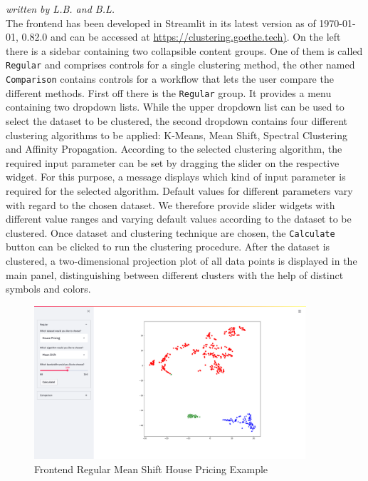 \textit{written by L.B. and B.L.}\\

The frontend has been developed in Streamlit \cite{streamlit2018} in its latest version as of \today, 0.82.0 and can be accessed at \url{https://clustering.goethe.tech)}.
On the left there is a sidebar containing two collapsible content groups. One of them is called \texttt{Regular} and comprises controls for a single clustering method, the other named \texttt{Comparison} contains controls for a workflow that lets the user compare the different methods.
First off there is the \texttt{Regular} group. It provides a menu containing two dropdown lists. While the upper dropdown list can be used to select the dataset to be clustered, the second dropdown contains four different clustering algorithms to be applied: K-Means, Mean Shift, Spectral Clustering and Affinity Propagation. According to the selected clustering algorithm, the required input parameter can be set by dragging the slider on the respective widget. For this purpose, a message displays which kind of input parameter is required for the selected algorithm. 
Default values for different parameters vary with regard to the chosen dataset. We therefore provide slider widgets with different value ranges and varying default values according to the dataset to be clustered.
Once dataset and clustering technique are chosen, the \texttt{Calculate} button can be clicked to run the clustering procedure.
After the dataset is clustered, a two-dimensional projection plot of all data points is displayed in the main panel, distinguishing between different clusters with the help of distinct symbols and colors.

\begin{figure}[H]
%
\begin{center}
\includegraphics[width=0.9\textwidth]{images/frontend_regular.png}
\caption{Frontend Regular Mean Shift House Pricing Example}
\end{center}
\label{img:frontend_screenshot_regular}
\end{figure}

